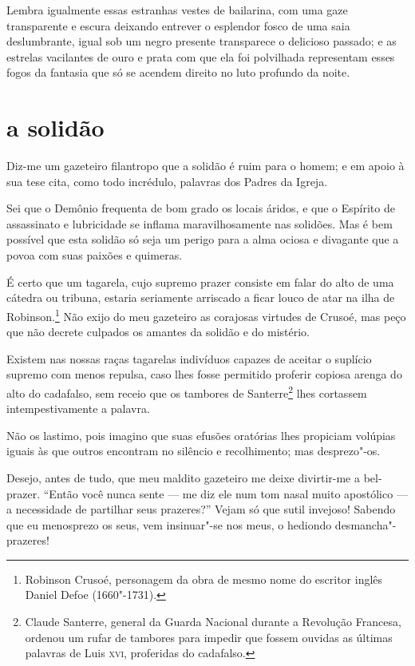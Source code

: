 Lembra igualmente essas estranhas vestes de bailarina, com uma
gaze transparente e escura deixando entrever o esplendor fosco de
uma saia deslumbrante, igual sob um negro presente transparece o delicioso
passado; e as estrelas vacilantes de ouro e prata com que ela foi
polvilhada representam esses fogos da fantasia que só se acendem direito
no luto profundo da noite.

\quebra\section[A solidão]{a solidão}

Diz-me um gazeteiro filantropo que a solidão é ruim para o homem; e em
apoio à sua tese cita, como todo incrédulo, palavras dos Padres
da Igreja.

Sei que o Demônio frequenta de bom grado os locais áridos, e que o
Espírito de assassinato e lubricidade se inflama maravilhosamente 
nas solidões. Mas é bem possível que esta solidão só seja um perigo
para a alma ociosa e divagante que a povoa com suas paixões e quimeras.

É certo que um tagarela, cujo supremo prazer consiste em falar do alto
de uma cátedra ou tribuna, estaria seriamente arriscado a
ficar louco de atar na ilha de Robinson.\protect\footnote{ Robinson 
Crusoé, personagem da obra de mesmo nome do escritor inglês Daniel Defoe (1660"-1731).} Não exijo
do meu gazeteiro as corajosas virtudes de Crusoé, mas peço que não
decrete culpados os amantes da solidão e do mistério.

Existem nas nossas raças tagarelas indivíduos capazes de aceitar o suplício supremo com menos
repulsa, caso lhes fosse permitido proferir copiosa arenga do
alto do cadafalso, sem receio que os tambores de
Santerre\protect\footnote{  Claude Santerre, general da Guarda Nacional durante a Revolução
Francesa, ordenou um rufar de tambores para impedir que fossem ouvidas
as últimas palavras de Luis \textsc{xvi}, proferidas do cadafalso.} lhes cortassem intempestivamente a palavra.

Não os lastimo, pois imagino que suas efusões oratórias lhes
propiciam volúpias iguais às que outros encontram no silêncio e
recolhimento; mas desprezo"-os.

Desejo, antes de tudo, que meu maldito gazeteiro me deixe divirtir-me a 
bel-prazer. “Então você nunca sente --- me diz ele num
tom nasal muito apostólico --- a necessidade de partilhar seus
prazeres?'' Vejam só que sutil invejoso! Sabendo que eu
menosprezo os seus, vem insinuar"-se nos meus, o hediondo
desmancha"-prazeres!

